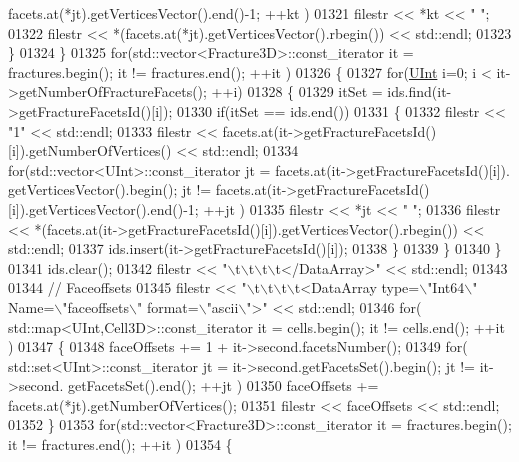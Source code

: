 \begin{DoxyCode}
      facets.at(*jt).getVerticesVector().end()-1; ++kt )
01321                 filestr << *kt << \textcolor{stringliteral}{" "};
01322             filestr << *(facets.at(*jt).getVerticesVector().rbegin()) << std::endl;
01323         \}
01324     \}
01325     \textcolor{keywordflow}{for}(std::vector<Fracture3D>::const\_iterator it = fractures.begin(); it != fractures.end(); ++it )
01326     \{
01327         \textcolor{keywordflow}{for}(\hyperlink{namespaceFVCode3D_a4bf7e328c75d0fd504050d040ebe9eda}{UInt} i=0; i < it->getNumberOfFractureFacets(); ++i)
01328         \{
01329             itSet = ids.find(it->getFractureFacetsId()[i]);
01330             \textcolor{keywordflow}{if}(itSet == ids.end())
01331             \{
01332                 filestr << \textcolor{stringliteral}{"1"} << std::endl;
01333                 filestr << facets.at(it->getFractureFacetsId()[i]).getNumberOfVertices() << std::endl;
01334                 \textcolor{keywordflow}{for}(std::vector<UInt>::const\_iterator jt = facets.at(it->getFractureFacetsId()[i]).
      getVerticesVector().begin(); jt != facets.at(it->getFractureFacetsId()[i]).getVerticesVector().end()-1; ++jt )
01335                     filestr << *jt << \textcolor{stringliteral}{" "};
01336                 filestr << *(facets.at(it->getFractureFacetsId()[i]).getVerticesVector().rbegin()) << 
      std::endl;
01337                 ids.insert(it->getFractureFacetsId()[i]);
01338             \}
01339         \}
01340     \}
01341     ids.clear();
01342     filestr << \textcolor{stringliteral}{"\(\backslash\)t\(\backslash\)t\(\backslash\)t\(\backslash\)t</DataArray>"} << std::endl;
01343 
01344     \textcolor{comment}{//  Faceoffsets}
01345     filestr << \textcolor{stringliteral}{"\(\backslash\)t\(\backslash\)t\(\backslash\)t\(\backslash\)t<DataArray type=\(\backslash\)"Int64\(\backslash\)" Name=\(\backslash\)"faceoffsets\(\backslash\)" format=\(\backslash\)"ascii\(\backslash\)">"} << std::endl;
01346     \textcolor{keywordflow}{for}( std::map<UInt,Cell3D>::const\_iterator it = cells.begin(); it != cells.end(); ++it )
01347     \{
01348         faceOffsets += 1 + it->second.facetsNumber();
01349         \textcolor{keywordflow}{for}( std::set<UInt>::const\_iterator jt = it->second.getFacetsSet().begin(); jt != it->second.
      getFacetsSet().end(); ++jt )
01350             faceOffsets += facets.at(*jt).getNumberOfVertices();
01351         filestr << faceOffsets << std::endl;
01352     \}
01353     \textcolor{keywordflow}{for}(std::vector<Fracture3D>::const\_iterator it = fractures.begin(); it != fractures.end(); ++it )
01354     \{

\end{DoxyCode}
